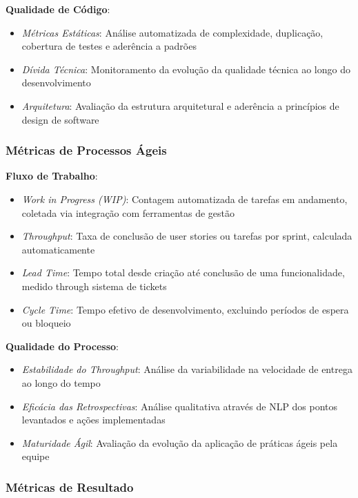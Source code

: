 \documentclass[12pt, a4paper, oneside, brazilian]{abntex2}
\begin{document}
\textbf{Qualidade de Código}:
\begin{itemize}
\item \textit{Métricas Estáticas}: Análise automatizada de complexidade, duplicação, cobertura de testes e aderência a padrões
\item \textit{Dívida Técnica}: Monitoramento da evolução da qualidade técnica ao longo do desenvolvimento
\item \textit{Arquitetura}: Avaliação da estrutura arquitetural e aderência a princípios de design de software
\end{itemize}

\subsubsection{Métricas de Processos Ágeis}

\textbf{Fluxo de Trabalho}:
\begin{itemize}
\item \textit{Work in Progress (WIP)}: Contagem automatizada de tarefas em andamento, coletada via integração com ferramentas de gestão
\item \textit{Throughput}: Taxa de conclusão de user stories ou tarefas por sprint, calculada automaticamente
\item \textit{Lead Time}: Tempo total desde criação até conclusão de uma funcionalidade, medido through sistema de tickets
\item \textit{Cycle Time}: Tempo efetivo de desenvolvimento, excluindo períodos de espera ou bloqueio
\end{itemize}

\textbf{Qualidade do Processo}:
\begin{itemize}
\item \textit{Estabilidade do Throughput}: Análise da variabilidade na velocidade de entrega ao longo do tempo
\item \textit{Eficácia das Retrospectivas}: Análise qualitativa através de NLP dos pontos levantados e ações implementadas
\item \textit{Maturidade Ágil}: Avaliação da evolução da aplicação de práticas ágeis pela equipe
\end{itemize}

\subsubsection{Métricas de Resultado}
\end{document}
